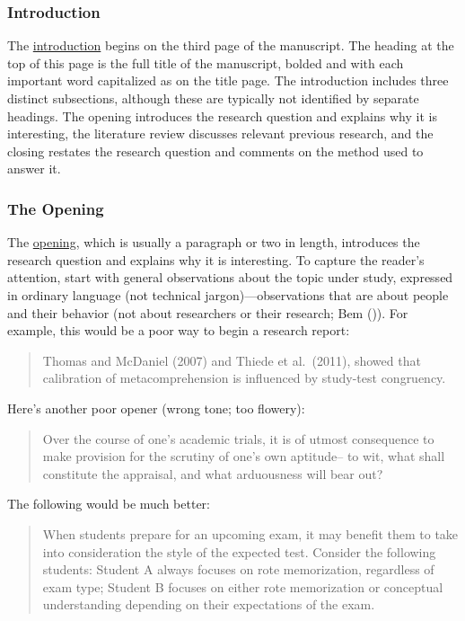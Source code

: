 \documentclass[
]{krantz}
\begin{document}
\subsubsection*{Introduction}\label{introduction}


The \hyperref[introduction]{introduction} begins on the third page of the manuscript. The heading at the top of this page is the full title of the manuscript, bolded and with each important word capitalized as on the title page. The introduction includes three distinct subsections, although these are typically not identified by separate headings. The opening introduces the research question and explains why it is interesting, the literature review discusses relevant previous research, and the closing restates the research question and comments on the method used to answer it.

\subsubsection*{The Opening}\label{the-opening}


The \hyperref[opening]{opening}, which is usually a paragraph or two in length, introduces the research question and explains why it is interesting. To capture the reader's attention, start with general observations about the topic under study, expressed in ordinary language (not technical jargon)---observations that are about people and their behavior (not about researchers or their research; Bem ()). For example, this would be a poor way to begin a research report:

\begin{quote}
Thomas and McDaniel (2007) and Thiede et al.~(2011), showed that calibration of metacomprehension is influenced by study-test congruency.
\end{quote}

Here's another poor opener (wrong tone; too flowery):

\begin{quote}
Over the course of one's academic trials, it is of utmost consequence to make provision for the scrutiny of one's own aptitude-- to wit, what shall constitute the appraisal, and what arduousness will bear out?
\end{quote}

The following would be much better:

\begin{quote}
When students prepare for an upcoming exam, it may benefit them to take into consideration the style of the expected test. Consider the following students: Student A always focuses on rote memorization, regardless of exam type; Student B focuses on either rote memorization or conceptual understanding depending on their expectations of the exam.
\end{quote}
\end{document}
